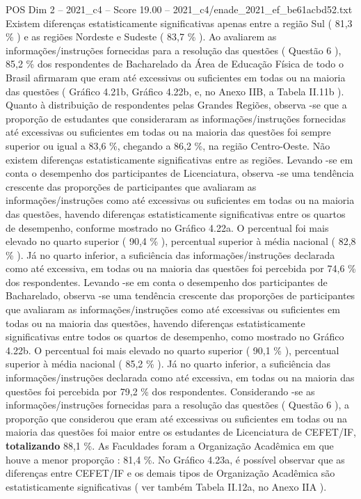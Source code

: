 \begin{textsample}{POS Dim 2 – 2021\_c4 – Score 19.00 – 2021\_c4/enade\_2021\_ef\_be61acbd52.txt}
Existem diferenças estatisticamente significativas apenas entre a região Sul ( 81,3 \% ) e as regiões Nordeste e Sudeste ( 83,7 \% ).
Ao avaliarem as informações/instruções fornecidas para a resolução das questões ( Questão 6 ), 85,2 \% dos respondentes de Bacharelado da Área de Educação Física de todo o Brasil afirmaram que eram até excessivas ou suficientes em todas ou na maioria das questões ( Gráfico 4.21b, Gráfico 4.22b, e, no Anexo IIB, a Tabela II.11b ).
Quanto à distribuição de respondentes pelas Grandes Regiões, observa -se que a proporção de estudantes que consideraram as informações/instruções fornecidas até excessivas ou suficientes em todas ou na maioria das questões foi sempre superior ou igual a 83,6 \%, chegando a 86,2 \%, na região Centro-Oeste.
Não existem diferenças estatisticamente significativas entre as regiões.
Levando -se em conta o desempenho dos participantes de Licenciatura, observa -se uma tendência crescente das proporções de participantes que avaliaram as informações/instruções como até excessivas ou suficientes em todas ou na maioria das questões, havendo diferenças estatisticamente significativas entre os quartos de desempenho, conforme mostrado no Gráfico 4.22a.
O percentual foi mais elevado no quarto superior ( 90,4 \% ), percentual superior à média nacional ( 82,8 \% ).
Já no quarto inferior, a suficiência das informações/instruções declarada como até excessiva, em todas ou na maioria das questões foi percebida por 74,6 \% dos respondentes.
Levando -se em conta o desempenho dos participantes de Bacharelado, observa -se uma tendência crescente das proporções de participantes que avaliaram as informações/instruções como até excessivas ou suficientes em todas ou na maioria das questões, havendo diferenças estatisticamente significativas entre todos os quartos de desempenho, como mostrado no Gráfico 4.22b.
O percentual foi mais elevado no quarto superior ( 90,1 \% ), percentual superior à média nacional ( 85,2 \% ).
Já no quarto inferior, a suficiência das informações/instruções declarada como até excessiva, em todas ou na maioria das questões foi percebida por 79,2 \% dos respondentes.
Considerando -se as informações/instruções fornecidas para a resolução das questões ( Questão 6 ), a proporção que considerou que eram até excessivas ou suficientes em todas ou na maioria das questões foi maior entre os estudantes de Licenciatura de CEFET/IF, \textbf{totalizando} 88,1 \%.
As Faculdades foram a Organização Acadêmica em que houve a menor proporção : 81,4 \%.
No Gráfico 4.23a, é possível observar que as diferenças entre CEFET/IF e os demais tipos de Organização Acadêmica são estatisticamente significativas ( ver também Tabela II.12a, no Anexo IIA ).

\end{textsample}
